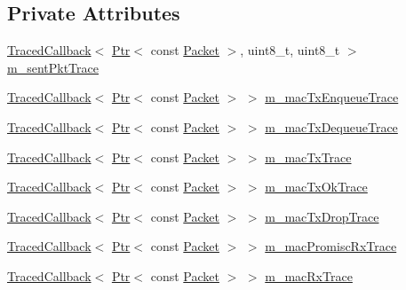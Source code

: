 \subsection*{Private Attributes}
\begin{DoxyCompactItemize}
\item 
\hyperlink{classns3_1_1TracedCallback}{Traced\+Callback}$<$ \hyperlink{classns3_1_1Ptr}{Ptr}$<$ const \hyperlink{classns3_1_1Packet}{Packet} $>$, uint8\+\_\+t, uint8\+\_\+t $>$ \hyperlink{classns3_1_1LrWpanMac_ac389be9d8b495db627c8f1b8036054cb}{m\+\_\+sent\+Pkt\+Trace}
\item 
\hyperlink{classns3_1_1TracedCallback}{Traced\+Callback}$<$ \hyperlink{classns3_1_1Ptr}{Ptr}$<$ const \hyperlink{classns3_1_1Packet}{Packet} $>$ $>$ \hyperlink{classns3_1_1LrWpanMac_ab5d97c9ba008e159e541ec27df3480ea}{m\+\_\+mac\+Tx\+Enqueue\+Trace}
\item 
\hyperlink{classns3_1_1TracedCallback}{Traced\+Callback}$<$ \hyperlink{classns3_1_1Ptr}{Ptr}$<$ const \hyperlink{classns3_1_1Packet}{Packet} $>$ $>$ \hyperlink{classns3_1_1LrWpanMac_ac59ab298ffb0b3608f5813dd237982db}{m\+\_\+mac\+Tx\+Dequeue\+Trace}
\item 
\hyperlink{classns3_1_1TracedCallback}{Traced\+Callback}$<$ \hyperlink{classns3_1_1Ptr}{Ptr}$<$ const \hyperlink{classns3_1_1Packet}{Packet} $>$ $>$ \hyperlink{classns3_1_1LrWpanMac_ab92d16ed0eba3f4357b949c0685c1a96}{m\+\_\+mac\+Tx\+Trace}
\item 
\hyperlink{classns3_1_1TracedCallback}{Traced\+Callback}$<$ \hyperlink{classns3_1_1Ptr}{Ptr}$<$ const \hyperlink{classns3_1_1Packet}{Packet} $>$ $>$ \hyperlink{classns3_1_1LrWpanMac_a0f0ba6655bd6aba1bac028bd25f4ab7a}{m\+\_\+mac\+Tx\+Ok\+Trace}
\item 
\hyperlink{classns3_1_1TracedCallback}{Traced\+Callback}$<$ \hyperlink{classns3_1_1Ptr}{Ptr}$<$ const \hyperlink{classns3_1_1Packet}{Packet} $>$ $>$ \hyperlink{classns3_1_1LrWpanMac_a3ff373bbe119ee781fda57327163b43a}{m\+\_\+mac\+Tx\+Drop\+Trace}
\item 
\hyperlink{classns3_1_1TracedCallback}{Traced\+Callback}$<$ \hyperlink{classns3_1_1Ptr}{Ptr}$<$ const \hyperlink{classns3_1_1Packet}{Packet} $>$ $>$ \hyperlink{classns3_1_1LrWpanMac_af05f835a006d0fa06af15d1d504219a4}{m\+\_\+mac\+Promisc\+Rx\+Trace}
\item 
\hyperlink{classns3_1_1TracedCallback}{Traced\+Callback}$<$ \hyperlink{classns3_1_1Ptr}{Ptr}$<$ const \hyperlink{classns3_1_1Packet}{Packet} $>$ $>$ \hyperlink{classns3_1_1LrWpanMac_a38183ee976b61d2c93942250f5670b7c}{m\+\_\+mac\+Rx\+Trace}

\end{DoxyCompactItemize}
